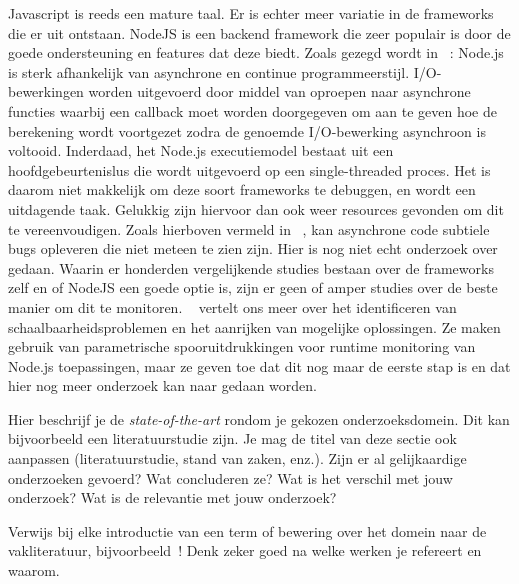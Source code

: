 Javascript is reeds een mature taal. Er is echter meer variatie in de frameworks die er uit ontstaan. NodeJS is een backend framework die zeer populair is door de goede ondersteuning en features dat deze biedt. Zoals gezegd wordt in ~\autocite{Runtime2017}: Node.js is sterk afhankelijk van asynchrone en continue programmeerstijl. I/O-bewerkingen worden uitgevoerd door middel van oproepen naar asynchrone functies waarbij een callback moet worden doorgegeven om aan te geven hoe de berekening wordt voortgezet zodra de genoemde I/O-bewerking asynchroon is voltooid. Inderdaad, het Node.js executiemodel bestaat uit een hoofdgebeurtenislus die wordt uitgevoerd op een single-threaded proces.
Het is daarom niet makkelijk om deze soort frameworks te debuggen, en wordt een uitdagende taak. Gelukkig zijn hiervoor dan ook weer resources gevonden om dit te vereenvoudigen. Zoals hierboven vermeld in ~\autocite{Runtime2017}, kan asynchrone code subtiele bugs opleveren die niet meteen te zien zijn. Hier is nog niet echt onderzoek over gedaan. Waarin er honderden vergelijkende studies bestaan over de frameworks zelf en of NodeJS een goede optie is, zijn er geen of amper studies over de beste manier om dit te monitoren. ~\autocite{Runtime2017} vertelt ons meer over  het identificeren van schaalbaarheidsproblemen en het aanrijken van mogelijke oplossingen. Ze maken gebruik van parametrische spooruitdrukkingen voor runtime monitoring van Node.js toepassingen, maar ze geven toe dat dit nog maar de eerste stap is en dat hier nog meer onderzoek kan naar gedaan worden. 



Hier beschrijf je de \emph{state-of-the-art} rondom je gekozen onderzoeksdomein. Dit kan bijvoorbeeld een literatuurstudie zijn. Je mag de titel van deze sectie ook aanpassen (literatuurstudie, stand van zaken, enz.). Zijn er al gelijkaardige onderzoeken gevoerd? Wat concluderen ze? Wat is het verschil met jouw onderzoek? Wat is de relevantie met jouw onderzoek?

Verwijs bij elke introductie van een term of bewering over het domein naar de vakliteratuur, bijvoorbeeld~\autocite{Doll1954}! Denk zeker goed na welke werken je refereert en waarom.



